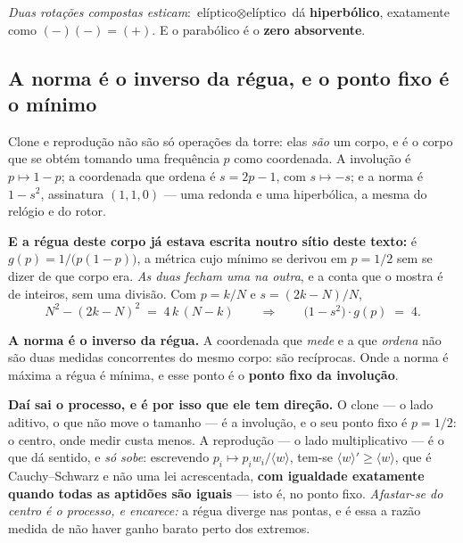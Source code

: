 \documentclass[livro.tex]{subfiles}
\begin{document}
\noindent \emph{Duas rotações compostas esticam}: $\text{elíptico}\otimes\text{elíptico}$ dá
\textbf{hiperbólico}, exatamente como $(-)(-)=(+)$. E o parabólico é o \textbf{zero absorvente}.

\subsection{A norma é o inverso da régua, e o ponto fixo é o mínimo}\label{sec:normaregua}

Clone e reprodução não são só operações da torre: elas \emph{são} um corpo, e é o corpo que se
obtém tomando uma frequência $p$ como coordenada. A involução é $p\mapsto 1-p$; a coordenada que
ordena é $s=2p-1$, com $s\mapsto -s$; e a norma é $1-s^2$, assinatura $(1,1,0)$ --- uma redonda e
uma hiperbólica, a mesma do relógio e do rotor.

\medskip
\noindent \textbf{E a régua deste corpo já estava escrita noutro sítio deste texto:} é
$g(p)=1/\bigl(p(1-p)\bigr)$, a métrica cujo mínimo se derivou em $p=1/2$ sem se dizer de que corpo
era. \emph{As duas fecham uma na outra}, e a conta que o mostra é de inteiros, sem uma divisão. Com
$p=k/N$ e $s=(2k-N)/N$,
\[
  N^2-(2k-N)^2 \;=\; 4\,k\,(N-k)
  \qquad\Longrightarrow\qquad
  \bigl(1-s^2\bigr)\cdot g(p) \;=\; 4 .
\]

\begin{mdframed}[linewidth=0.4pt,innerleftmargin=10pt,innerrightmargin=10pt,
                 innertopmargin=8pt,innerbottommargin=8pt,skipabove=6pt,skipbelow=6pt]
\textbf{A norma é o inverso da régua.} A coordenada que \emph{mede} e a que \emph{ordena} não são
duas medidas concorrentes do mesmo corpo: são recíprocas. Onde a norma é máxima a régua é mínima, e
esse ponto é o \textbf{ponto fixo da involução}.
\end{mdframed}

\noindent \textbf{Daí sai o processo, e é por isso que ele tem direção.} O clone --- o lado aditivo,
o que não move o tamanho --- é a involução, e o seu ponto fixo é $p=1/2$: o centro, onde medir custa
menos. A reprodução --- o lado multiplicativo --- é o que dá sentido, e \emph{só sobe}: escrevendo
$p_i\mapsto p_i w_i/\langle w\rangle$, tem-se $\langle w\rangle'\ge\langle w\rangle$, que é
Cauchy--Schwarz e não uma lei acrescentada, \textbf{com igualdade exatamente quando todas as
aptidões são iguais} --- isto é, no ponto fixo. \emph{Afastar-se do centro é o processo, e encarece:}
a régua diverge nas pontas, e é essa a razão medida de não haver ganho barato perto dos extremos.
\end{document}
